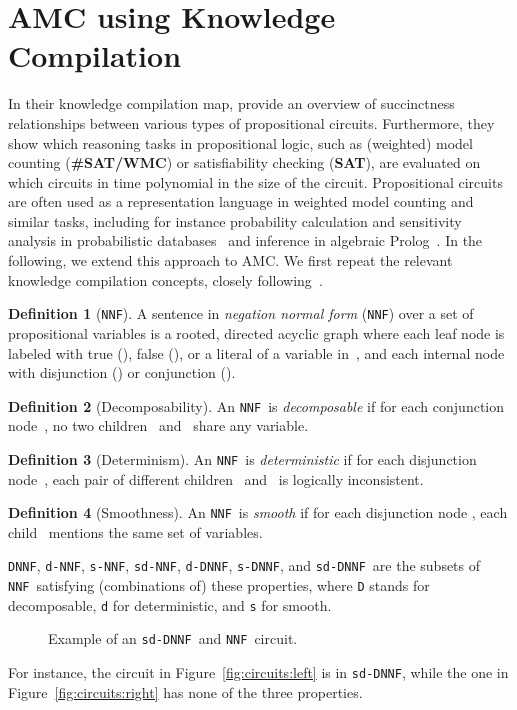 \documentclass{article}
\theoremstyle{plain}
\theoremstyle{definition}
\newtheorem{definition}{Definition}
\newcommand{\NNF}{{\tt NNF}}
\newcommand{\dNNF}{{\tt d-NNF}}
\newcommand{\sNNF}{{\tt s-NNF}}
\newcommand{\DNNF}{{\tt DNNF}}
\newcommand{\dDNNF}{{\tt d-DNNF}}
\newcommand{\sDNNF}{{\tt s-DNNF}}
\newcommand{\sdDNNF}{{\tt sd-DNNF}}
\newcommand{\sdNNF}{{\tt sd-NNF}}
\begin{document}
\section{AMC using Knowledge Compilation} \label{sec:amc-kc}
In their knowledge compilation map, \citet{darwiche2002knowledge}
provide an overview of succinctness relationships between various
types of propositional circuits. Furthermore, they show which reasoning tasks in
propositional logic, such as (weighted) model
counting (\textbf{\#SAT/WMC}) or satisfiability checking
(\textbf{SAT}), are evaluated on which circuits in time polynomial in
the size of the circuit.  Propositional circuits are often used as a
representation language in  weighted model counting and similar
tasks, including for instance probability calculation and
sensitivity analysis in probabilistic databases~\citep{Jha11,Kanagal11}
and  inference in algebraic
Prolog~\citep{Kimmig11}. In the following, we extend this approach to
AMC. We  first repeat the relevant knowledge compilation
concepts, closely following~\citet{darwiche2002knowledge}.

\begin{definition}[\NNF]
A sentence in \emph{negation normal form} (\NNF) over a set of propositional variables 
is a rooted, directed acyclic graph where each leaf node is labeled
with true (), false (), or a literal of a variable in~, and
each internal node with disjunction () or conjunction (). 
\end{definition}

\begin{definition}[Decomposability]
An \NNF\ is \emph{decomposable} if for each conjunction
node~, no two children~ and~
share any variable. 
\end{definition}
\begin{definition}[Determinism]
An \NNF\ is \emph{deterministic} if for each disjunction
node~, each pair of different 
children~ and~ is logically inconsistent.
\end{definition}
\begin{definition}[Smoothness]
An \NNF\ is \emph{smooth} if for each disjunction
node , each child~ mentions the
same set of variables.
\end{definition}
\DNNF, \dNNF, \sNNF, \sdNNF, \dDNNF, \sDNNF, and \sdDNNF\ are the
subsets of \NNF\ satisfying  (combinations of)
these properties, where \texttt{D} stands for decomposable, \texttt{d} for
deterministic, and \texttt{s} for smooth. 
\begin{figure}
\center
\subfloat[\sdDNNF]{\label{fig:circuits:left} \texttt{[image: sdDNNF.pdf]}}
\subfloat[\NNF]{\label{fig:circuits:right} \texttt{[image: NNF.pdf]}}
\caption{Example of an \sdDNNF\ and \NNF\ circuit.}
\label{fig:circuits}
\end{figure}
For instance, the circuit in Figure~\ref{fig:circuits:left} is in \sdDNNF,
while the one in Figure~\ref{fig:circuits:right} has none of the three properties.
\end{document}
